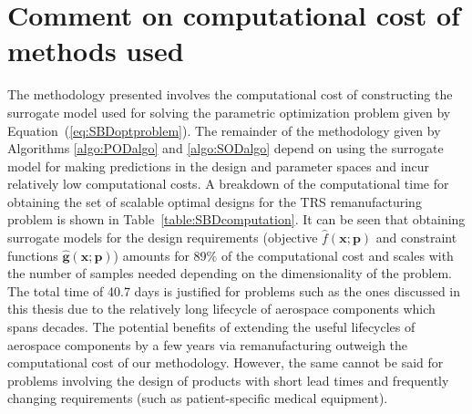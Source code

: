 {\color{red}
\section{Comment on computational cost of methods used}
\label{sec:comptcostSBD}

The methodology presented involves the computational cost of constructing the surrogate model used for solving the parametric optimization problem given by Equation~(\ref{eq:SBDoptproblem}). The remainder of the methodology given by Algorithms \ref{algo:PODalgo} and \ref{algo:SODalgo} depend on using the surrogate model for making predictions in the design and parameter spaces and incur relatively low computational costs. A breakdown of the computational time for obtaining the set of scalable optimal designs for the \ac{TRS} remanufacturing problem is shown in Table~\ref{table:SBDcomputation}. It can be seen that obtaining surrogate models for the design requirements (objective $\hat{f}(\mathbf{x};\mathbf{p})$ and constraint functions $\hat{\mathbf{g}}(\mathbf{x};\mathbf{p})$) amounts for 89$\%$ of the computational cost and scales with the number of samples needed depending on the dimensionality of the problem. The total time of 40.7 days is justified for problems such as the ones discussed in this thesis due to the relatively long lifecycle of aerospace components which spans decades. The potential benefits of extending the useful lifecycles of aerospace components by a few years via remanufacturing outweigh the computational cost of our methodology. However, the same cannot be said for problems involving the design of products with short lead times and frequently changing requirements (such as patient-specific medical equipment).}

